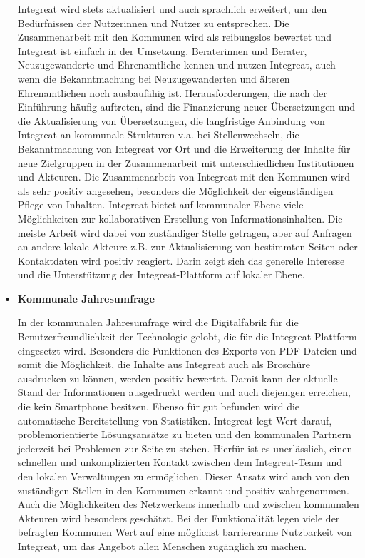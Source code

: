 \documentclass[12pt, a4paper]{article} %
\begin{document}
\begin{itemize}
Integreat wird stets aktualisiert und auch sprachlich erweitert, um den
Bedürfnissen der Nutzerinnen und Nutzer zu entsprechen. Die
Zusammenarbeit mit den Kommunen wird als reibungslos bewertet und
Integreat ist einfach in der Umsetzung. Beraterinnen und Berater,
Neuzugewanderte und Ehrenamtliche kennen und nutzen Integreat, auch wenn
die Bekanntmachung bei Neuzugewanderten und älteren Ehrenamtlichen noch
ausbaufähig ist. Herausforderungen, die nach der Einführung häufig
auftreten, sind die Finanzierung neuer Übersetzungen und die
Aktualisierung von Übersetzungen, die langfristige Anbindung von
Integreat an kommunale Strukturen v.a. bei Stellenwechseln, die
Bekanntmachung von Integreat vor Ort und die Erweiterung der Inhalte für
neue Zielgruppen in der Zusammenarbeit mit unterschiedlichen
Institutionen und Akteuren. Die Zusammenarbeit von Integreat mit den
Kommunen wird als sehr positiv angesehen, besonders die Möglichkeit der
eigenständigen Pflege von Inhalten. Integreat bietet auf kommunaler
Ebene viele Möglichkeiten zur kollaborativen Erstellung von
Informationsinhalten. Die meiste Arbeit wird dabei von zuständiger
Stelle getragen, aber auf Anfragen an andere lokale Akteure z.B. zur
Aktualisierung von bestimmten Seiten oder Kontaktdaten wird positiv
reagiert. Darin zeigt sich das generelle Interesse und die Unterstützung
der Integreat-Plattform auf lokaler Ebene.

\item  \textbf{Kommunale Jahresumfrage}

In der kommunalen Jahresumfrage wird die Digitalfabrik für die
Benutzerfreundlichkeit der Technologie gelobt, die für die
Integreat-Plattform eingesetzt wird. Besonders die Funktionen des
Exports von PDF-Dateien und somit die Möglichkeit, die Inhalte aus
Integreat auch als Broschüre ausdrucken zu können, werden positiv
bewertet. Damit kann der aktuelle Stand der Informationen ausgedruckt
werden und auch diejenigen erreichen, die kein Smartphone besitzen.
Ebenso für gut befunden wird die automatische Bereitstellung von
Statistiken. Integreat legt Wert darauf, problemorientierte
Lösungsansätze zu bieten und den kommunalen Partnern jederzeit bei
Problemen zur Seite zu stehen. Hierfür ist es unerlässlich, einen
schnellen und unkomplizierten Kontakt zwischen dem Integreat-Team und
den lokalen Verwaltungen zu ermöglichen. Dieser Ansatz wird auch von den
zuständigen Stellen in den Kommunen erkannt und positiv wahrgenommen.
Auch die Möglichkeiten des Netzwerkens innerhalb und zwischen kommunalen
Akteuren wird besonders geschätzt. Bei der Funktionalität legen viele
der befragten Kommunen Wert auf eine möglichst barrierearme Nutzbarkeit
von Integreat, um das Angebot allen Menschen zugänglich zu machen.


\end{itemize}
\end{document}
